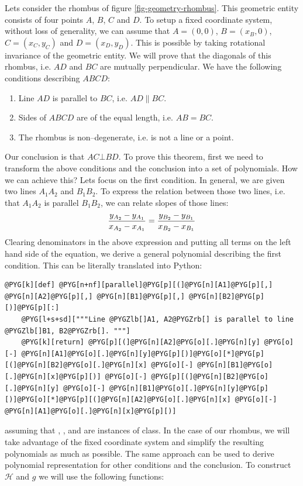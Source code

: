 Lets consider the rhombus of figure \ref{fig-geometry-rhombus}. This geometric entity consists of four
points $A$, $B$, $C$ and $D$. To setup a fixed coordinate system, without loss of generality, we can
assume that $A = (0, 0)$, $B = (x_B, 0)$, $C = (x_C, y_C)$ and $D = (x_D, y_D)$. This is possible by
taking rotational invariance of the geometric entity. We will prove that the diagonals of this rhombus,
i.e. $AD$ and $BC$ are mutually perpendicular. We have the following conditions describing $ABCD$:
\begin{enumerate}
\item {} 
Line $AD$ is parallel to $BC$, i.e. $AD \parallel BC$.

\item {} 
Sides of $ABCD$ are of the equal length, i.e. $AB = BC$.

\item {} 
The rhombus is non--degenerate, i.e. is not a line or a point.

\end{enumerate}

Our conclusion is that $AC \bot BD$. To prove this theorem, first we need to transform the above conditions
and the conclusion into a set of polynomials. How we can achieve this? Lets focus on the first condition. In
general, we are given two lines $A_1A_2$ and $B_1B_2$. To express the relation between those two lines, i.e.
that $A_1A_2$ is parallel $B_1B_2$, we can relate slopes of those lines:
\begin{gather}
\begin{split}\frac{y_{A_2} - y_{A_1}}{x_{A_2} - x_{A_1}} = \frac{y_{B_2} - y_{B_1}}{x_{B_2} - x_{B_1}}\end{split}\notag
\end{gather}
Clearing denominators in the above expression and putting all terms on the left hand side of the equation, we
derive a general polynomial describing the first condition. This can be literally translated into Python:

\begin{Verbatim}[commandchars=@\[\]]
@PYG[k][def] @PYG[n+nf][parallel]@PYG[p][(]@PYG[n][A1]@PYG[p][,] @PYG[n][A2]@PYG[p][,] @PYG[n][B1]@PYG[p][,] @PYG[n][B2]@PYG[p][)]@PYG[p][:]
    @PYG[l+s+sd]["""Line @PYGZlb[]A1, A2@PYGZrb[] is parallel to line @PYGZlb[]B1, B2@PYGZrb[]. """]
    @PYG[k][return] @PYG[p][(]@PYG[n][A2]@PYG[o][.]@PYG[n][y] @PYG[o][-] @PYG[n][A1]@PYG[o][.]@PYG[n][y]@PYG[p][)]@PYG[o][*]@PYG[p][(]@PYG[n][B2]@PYG[o][.]@PYG[n][x] @PYG[o][-] @PYG[n][B1]@PYG[o][.]@PYG[n][x]@PYG[p][)] @PYG[o][-] @PYG[p][(]@PYG[n][B2]@PYG[o][.]@PYG[n][y] @PYG[o][-] @PYG[n][B1]@PYG[o][.]@PYG[n][y]@PYG[p][)]@PYG[o][*]@PYG[p][(]@PYG[n][A2]@PYG[o][.]@PYG[n][x] @PYG[o][-] @PYG[n][A1]@PYG[o][.]@PYG[n][x]@PYG[p][)]
\end{Verbatim}
\noindent
assuming that , ,  and  are instances of  class. In the case of our
rhombus, we will take advantage of the fixed coordinate system and simplify the resulting polynomials as
much as possible. The same approach can be used to derive polynomial representation for other conditions
and the conclusion. To construct $\mathcal{H}$ and $g$ we will use the following functions:

